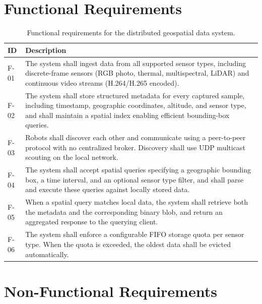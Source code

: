 \section{Functional Requirements} \label{sec:functional-requirements}

\begin{table}[H]
\centering
\caption{Functional requirements for the distributed geospatial data system.}
\label{tab:functional-requirements}
\begin{tabular}{l p{10cm}}
\hline
\textbf{ID} & \textbf{Description} \\
\hline
F-01 & The system shall ingest data from all supported sensor types, including discrete-frame sensors (RGB photo, thermal, multispectral, LiDAR) and continuous video streams (H.264/H.265 encoded). \\
F-02 & The system shall store structured metadata for every captured sample, including timestamp, geographic coordinates, altitude, and sensor type, and shall maintain a spatial index enabling efficient bounding-box queries. \\
F-03 & Robots shall discover each other and communicate using a peer-to-peer protocol with no centralized broker. Discovery shall use UDP multicast scouting on the local network. \\
F-04 & The system shall accept spatial queries specifying a geographic bounding box, a time interval, and an optional sensor type filter, and shall parse and execute these queries against locally stored data. \\
F-05 & When a spatial query matches local data, the system shall retrieve both the metadata and the corresponding binary blob, and return an aggregated response to the querying client. \\
F-06 & The system shall enforce a configurable FIFO storage quota per sensor type. When the quota is exceeded, the oldest data shall be evicted automatically. \\
\hline
\end{tabular}
\end{table}


\section{Non-Functional Requirements} \label{sec:non-functional-requirements}

